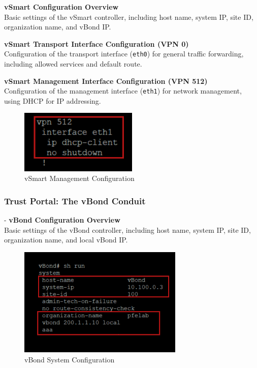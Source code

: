 \documentclass[12pt,english]{report}
\renewcommand{\footrulewidth}{0.4pt}
\renewcommand{\footrulewidth}{0.4pt}
\begin{document}
\textbf{vSmart Configuration Overview} \\
Basic settings of the vSmart controller, including host name, system IP, site ID, organization name, and vBond IP.

\vfill %
\hfill \textbf{\thepage} %
\renewcommand{\footrulewidth}{0.4pt} \footrule %

\newpage
\textbf{vSmart Transport Interface Configuration (VPN 0)} \\
Configuration of the transport interface (\texttt{eth0}) for general traffic forwarding, including allowed services and default route.

\textbf{vSmart Management Interface Configuration (VPN 512)} \\
    Configuration of the management interface (\texttt{eth1}) for network management, using DHCP for IP addressing.
\begin{figure}[H]
    \centering
    \includegraphics[width= 0.5\textwidth]{chapitre 3/23.png}
    \caption{vSmart Management Configuration}
    \label{fig: vSmart Management Configuration}
\end{figure}
\subsubsection{Trust Portal: The vBond Conduit}
- \textbf{vBond Configuration Overview} \\
    Basic settings of the vBond controller, including host name, system IP, site ID, organization name, and local vBond IP.
\begin{figure}[H]
    \centering
    \includegraphics[width= 0.7\textwidth]{chapitre 3/24.png}
    \caption{vBond System Configuration}
    \label{fig: vBond System Configuration}
\end{figure}
\end{document}
